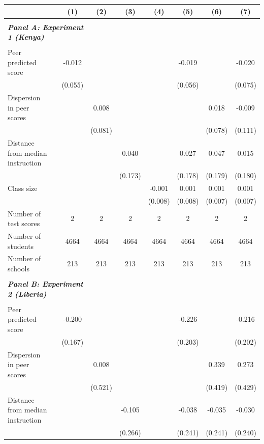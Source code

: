 \begin{center} 
\caption{\small Effect on test scores} 
\label{tab:descriptives} 
\begin{scriptsize}
\begin{threeparttable}
\begin{tabular} {@{} l l c c c c c c c  @{}} \toprule \toprule
& &(1)&(2)&(3)&(4)&(5)&(6)&(7) \\ \midrule 
\\
\multicolumn{3}{l}{\textbf{\textit{Panel A: Experiment 1 (Kenya)}}} \\
\\
Peer predicted score &  & -0.012 &  &  &  & -0.019 &  & -0.020 \\
                 &  & (0.055) &  &  &  & (0.056) &  & (0.075) \\
Dispersion in peer scores &  &  & 0.008 &  &  &  & 0.018 & -0.009 \\
                 &  &  & (0.081) &  &  &  & (0.078) & (0.111) \\
Distance from median instruction &  &  &  & 0.040 &  & 0.027 & 0.047 & 0.015 \\
                 &  &  &  & (0.173) &  & (0.178) & (0.179) & (0.180) \\
Class size &  &  &  &  & -0.001 & 0.001 & 0.001 & 0.001 \\
                 &  &  &  &  & (0.008) & (0.008) & (0.007) & (0.007) \\
\midrule
Number of test scores &  & 2 & 2 & 2 & 2 & 2 & 2 & 2 \\
Number of students &  & 4664 & 4664 & 4664 & 4664 & 4664 & 4664 & 4664 \\
Number of schools &  & 213 & 213 & 213 & 213 & 213 & 213 & 213 \\
 \midrule
\\
\multicolumn{3}{l}{\textbf{\textit{Panel B: Experiment 2 (Liberia)}}} \\
\\
Peer predicted score &  & -0.200 &  &  &  & -0.226 &  & -0.216 \\
                 &  & (0.167) &  &  &  & (0.203) &  & (0.202) \\
Dispersion in peer scores &  &  & 0.008 &  &  &  & 0.339 & 0.273 \\
                 &  &  & (0.521) &  &  &  & (0.419) & (0.429) \\
Distance from median instruction &  &  &  & -0.105 &  & -0.038 & -0.035 & -0.030 \\
                 &  &  &  & (0.266) &  & (0.241) & (0.241) & (0.240) \\

\end{tabular}
\end{threeparttable}
\end{scriptsize}
\end{center}
